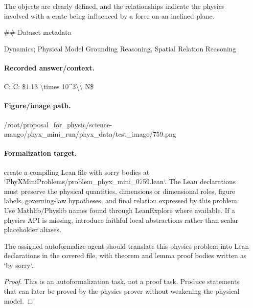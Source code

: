 The objects are clearly defined, and the relationships indicate the physics involved with a crate being influenced by a force on an inclined plane.

\#\# Dataset metadata

Dynamics; Physical Model Grounding Reasoning, Spatial Relation Reasoning

\paragraph{Recorded answer/context.}
C: C: \$1.13 \textbackslash{}times 10\textasciicircum{}3\textbackslash{}\textbackslash{} N\$

\paragraph{Figure/image path.}
/root/proposal\_for\_physic/science-mango/phyx\_mini\_run/phyx\_data/test\_image/759.png

\paragraph{Formalization target.}
create a compiling Lean file with sorry bodies at `PhyXMiniProblems/problem\_phyx\_mini\_0759.lean`. The Lean declarations must preserve the physical quantities, dimensions or dimensional roles, figure labels, governing-law hypotheses, and final relation expressed by this problem.
Use Mathlib/Physlib names found through LeanExplore where available. If a physics API is missing, introduce faithful local abstractions rather than scalar placeholder aliases.

\begin{theorem}
\label{thm:physics:phyx_mini_0759:target}
The assigned autoformalize agent should translate this physics problem into Lean declarations in the covered file, with theorem and lemma proof bodies written as `by sorry`.
\end{theorem}
\begin{proof}
This is an autoformalization task, not a proof task. Produce statements that can later be proved by the physics prover without weakening the physical model.
\end{proof}

